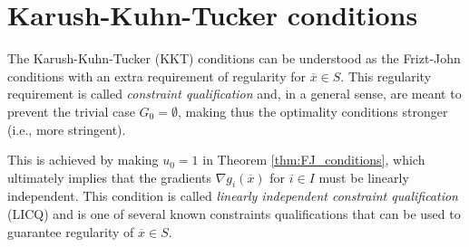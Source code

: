  
\section{Karush-Kuhn-Tucker conditions}


The Karush-Kuhn-Tucker (KKT) conditions can be understood as the Frizt-John conditions with an extra requirement of regularity for $\overline{x} \in S$. This regularity requirement is called \emph{constraint qualification} and, in a general sense, are meant to prevent the trivial case $G_0 = \emptyset$, making thus the optimality conditions stronger (i.e., more stringent).

This is achieved by making $u_0 = 1$ in Theorem \ref{thm:FJ_conditions}, which ultimately implies that the gradients $\nabla g_i(\overline{x})$ for $i \in I$ must be linearly independent. This condition is called \emph{linearly independent constraint qualification} (LICQ) and is one of several known constraints qualifications that can be used to guarantee regularity of $\overline{x} \in S$. 

